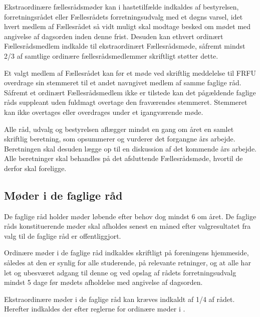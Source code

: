 \begin{list}
\item \label{S:FRmoeder:ekstra} Ekstraordinære fællesrådsmøder kan i hastetilfælde indkaldes af bestyrelsen, forretningsrådet eller Fællesrådets forretningsudvalg med et døgns varsel, idet hvert medlem af Fællesrådet så vidt muligt skal modtage besked om mødet med angivelse af dagsorden inden denne frist. Desuden kan ethvert ordinært Fællesrådsmedlem indkalde til ekstraordinært Fællesrådsmøde, såfremt mindst 2/3 af samtlige ordinære fællesrådsmedlemmer skriftligt støtter dette.

\item  Et valgt medlem af Fællesrådet kan før et møde ved skriftlig meddelelse til FRFU overdrage sin stemmeret til et andet navngivet medlem af samme faglige råd. Såfremt et ordinært Fællesrådsmedlem ikke er tilstede kan det pågældende faglige råds suppleant uden fuldmagt overtage den fraværendes stemmeret. Stemmeret kan ikke overtages eller overdrages under et igangværende møde.

\item  Alle råd, udvalg og bestyrelsen aflægger mindst en gang om året en samlet skriftlig beretning, som opsummerer og vurderer det forgangne års arbejde. Beretningen skal desuden lægge op til en diskussion af det kommende års arbejde. Alle beretninger skal behandles på det afsluttende Fællesrådsmøde, hvortil de derfor skal foreligge.


\subsection{Møder i de faglige råd}
\label{S:kap:FagligMoeder}
\item De faglige råd holder møder løbende efter behov dog mindst 6 om året. De faglige råds konstituerende møder skal afholdes senest en måned efter valgresultatet fra valg til de faglige råd er offentliggjort.

\item  \label{S:FagligMoeder:indkaldelse} Ordinære møder i de faglige råd indkaldes skriftligt på foreningens hjemmeside, således at den er synlig for alle studerende, på relevante retninger, og at alle har let og ubesværet adgang til denne og ved opslag af rådets forretningsudvalg mindst 5 dage før mødets afholdelse med angivelse af dagsorden. 

\item  Ekstraordinære møder i de faglige råd kan kræves indkaldt af 1/4 af rådet. Herefter indkaldes der efter reglerne for ordinære møder i .


\end{list}
